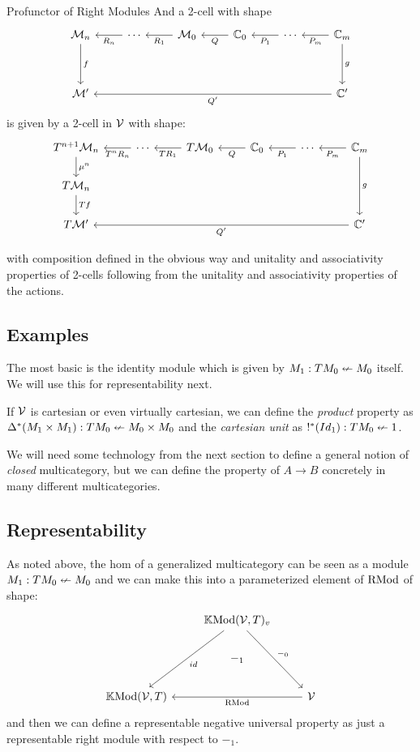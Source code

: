 \documentclass{article}
\begin{document}
\begin{definition}{Profunctor of Right Modules}
  And a 2-cell with shape 
  \[\begin{tikzcd}
{\vcat M}_n \arrow[dd, "f"] & \cdots \arrow[l, "R_n"] & {\vcat M}_0 \arrow[l, "R_1"] & {\cat C}_0 \arrow[l, "Q"] & \cdots \arrow[l, "P_1"] &  {\cat C}_m \arrow[l, "P_m"] \arrow[dd, "g"] \\
 &  &  &  &  &  \\
{\vcat M}' &  &  &  &  & {\cat C}' \arrow[lllll, "Q'"]
  \end{tikzcd}\]
  is given by a 2-cell in $\mathcal V$ with shape:
  \[\begin{tikzcd}
T^{n+1}\vcat{M}_n \arrow[d, "\mu^n"] & \cdots \arrow[l, "T^nR_n"] & T\vcat{M}_0 \arrow[l, "TR_1"] & \cat C_0 \arrow[l, "Q"] & \cdots \arrow[l, "P_1"] & \cat C_m \arrow[l, "P_m"] \arrow[dd, "g"] \\
T\vcat{M}_n \arrow[d, "Tf"] &  &  &  &  &  \\
T\vcat{M}' &  &  &  &  & \cat C' \arrow[lllll, "Q'"]
\end{tikzcd}
  \]

  with composition defined in the obvious way and unitality and
  associativity properties of 2-cells following from the unitality and
  associativity properties of the actions.
\end{definition}

\subsection{Examples}

The most basic is the identity module which is given by $M_1 : TM_0
\nleftarrow M_0$ itself. We will use this for representability next.

If $\mathcal V$ is cartesian or even virtually cartesian, we can define
the \emph{product} property as $\Delta^{*}(M_1\times M_1) : TM_0
\nleftarrow M_0\times M_0$ and the \emph{cartesian unit} as $!^*(Id_{1}) :
TM_0 \nleftarrow 1$.

We will need some technology from the next section to define a general
notion of \emph{closed} multicategory, but we can define the property
of $A \to B$ concretely in many different multicategories.

\subsection{Representability}

As noted above, the hom of a generalized multicategory can be seen as
a module $M_1 : T M_0 \nleftarrow M_0$ and we can make this into a
parameterized element of $\text{RMod}$ of shape:
  \[
  \begin{tikzcd}
 & \vtkmnd_v \arrow[ldd,"id"] \arrow[rdd, "-_{0}"] &  \\
 & -_1 &  \\
\vtkmnd &  & \vcat V \arrow[ll, "\rmod"]
\end{tikzcd}
  \]
and then we can define a representable negative universal property as
just a representable right module with respect to $-_1$.
\end{document}
